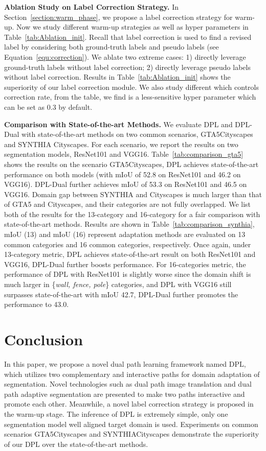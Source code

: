 \documentclass[10pt,twocolumn,letterpaper]{article}
\begin{document}
{\noindent \textbf{Ablation Study on Label Correction Strategy.}}\hspace{3pt}
In Section~\ref{section:warm_phase}, we propose a label correction strategy for  warm-up. Now we study different warm-up strategies as well as hyper parameters in Table~\ref{tab:Ablation_init}. Recall that label correction is used to find a revised label  by considering both ground-truth labels  and pseudo labels  (see Equation~\ref{equ:correction}). We ablate two extreme cases: 1) directly leverage ground-truth labels  without label correction; 2) directly leverage pseudo labels  without label correction. Results in Table~\ref{tab:Ablation_init} shows the superiority of our label correction module. We also study different  which controls correction rate, from the table, we find  is a less-sensitive hyper parameter which can be set as 0.3 by default.

{\noindent \textbf{Comparison with State-of-the-art Methods.}}\hspace{3pt}
\label{sec:experiments}
We evaluate DPL and DPL-Dual with state-of-the-art methods on two common scenarios, GTA5Cityscapes and SYNTHIA Cityscapes. For each scenario, we report the results on two segmentation models, ResNet101 and VGG16. Table~\ref{tab:comparison_gta5} shows the results on the scenario GTA5Cityscapes, DPL achieves state-of-the-art performance on both models (with mIoU of 52.8 on ResNet101 and 46.2 on VGG16). DPL-Dual further achieves mIoU of 53.3 on ResNet101 and 46.5 on VGG16. Domain gap between SYNTHIA and Cityscapes is much larger than that of GTA5 and Cityscapes, and their categories are not fully overlapped. We list both of the results for the 13-category and 16-category for a fair comparison with state-of-the-art methods. Results are shown in Table~\ref{tab:comparison_synthia}, mIoU (13) and mIoU (16) represent adaptation methods are evaluated on 13 common categories and 16 common categories, respectively. Once again, under 13-category metric, DPL achieves state-of-the-art result on both ResNet101 and VGG16, DPL-Dual further boosts performance. For 16-categories metric, the performance of DPL with ResNet101 is slightly worse since the domain shift is much larger in \{\textit{wall, fence, pole}\} categories, and DPL with VGG16 still surpasses state-of-the-art with mIoU 42.7, DPL-Dual further promotes the performance to 43.0.


\section{Conclusion}
In this paper, we propose a novel dual path learning framework named DPL, which utilizes two complementary and interactive paths for domain adaptation of segmentation. Novel technologies such as dual path image translation and dual path adaptive segmentation are presented to make two paths interactive and promote each other. Meanwhile, a novel label correction strategy is proposed in the warm-up stage. The inference of DPL is extremely simple, only one segmentation model well aligned target domain is used. Experiments on common scenarios GTA5Cityscapes and SYNTHIACityscapes demonstrate the superiority of our DPL over the state-of-the-art methods.
\end{document}
